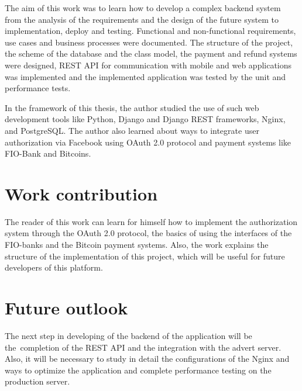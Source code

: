 The aim of this work was to learn how to develop a complex backend system from the analysis of the requirements and the
design of the future system to implementation, deploy and testing. Functional and non-functional requirements, use cases
and business processes were documented. The structure of the project, the scheme of the database and the class model,
the payment and refund systems were designed, \ac{REST} \ac{API} for communication with mobile and web applications was
implemented and the implemented application was tested by the unit and performance tests.

In the framework of this thesis, the author studied the use of such web development tools like Python, Django and Django
REST frameworks, Nginx, and PostgreSQL. The author also learned about ways to integrate user authorization via Facebook
using OAuth 2.0 protocol and payment systems like FIO-Bank and Bitcoins.


\section{Work contribution}
The reader of this work can learn for himself how to implement the authorization system through the OAuth 2.0 protocol,
the basics of using the interfaces of the FIO-banks and the Bitcoin payment systems. Also, the work explains
the structure of the implementation of this project, which will be useful for future developers of this platform.

\section{Future outlook}
The next step in developing of the backend of the application will be the~completion of the \ac{REST} \ac{API} and
the integration with the advert server. Also, it will be necessary to study in detail the configurations of the Nginx
and ways to optimize the application and complete performance testing on the production server.
